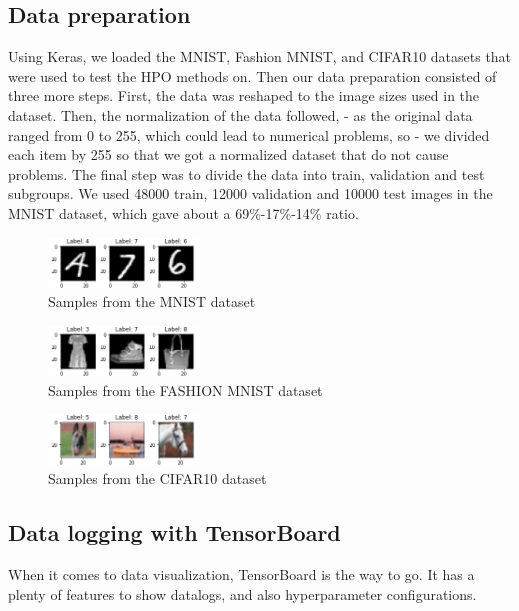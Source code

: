 \documentclass[conference]{IEEEtran}
\begin{document}
\subsection{Data preparation}
Using Keras, we loaded the MNIST, Fashion MNIST, and CIFAR10 datasets that were used to test the HPO methods on. Then our data preparation consisted of three more steps. First, the data was  reshaped to the image sizes used in the dataset. Then, the normalization of the data followed, -  as the original data ranged from 0 to 255, which could lead to numerical problems, so  -  we divided each item by 255 so that we got a normalized dataset that do not cause problems. The final step was to divide the data into train, validation and test subgroups. We used 48000 train, 12000 validation and 10000 test images in the MNIST dataset, which gave about a 69\%-17\%-14\% ratio.
\begin{figure}[htbp]
\centerline{\includegraphics[width=0.35\textwidth]{mnist.png}}
\caption{Samples from the MNIST dataset}
\label{mnist}
\end{figure}\vspace{-1.0cm}
\begin{figure}[htbp]
\centerline{\includegraphics[width=0.35\textwidth]{fashion_mnist.png}}
\caption{Samples from the FASHION MNIST dataset}
\label{fashion_mnist}
\end{figure}\vspace{-0.5cm}
\begin{figure}[htbp]
\centerline{\includegraphics[width=0.35\textwidth]{cifar10.png}}
\caption{Samples from the CIFAR10 dataset}
\label{cifar10}
\end{figure}

\subsection{Data logging with TensorBoard}
When it comes to data visualization, TensorBoard is the way to go. It has a plenty of features to show datalogs, and also hyperparameter configurations.
\end{document}
